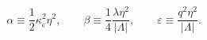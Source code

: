 \begin{equation}\label{eq:dimless2}
\alpha\equiv\frac{1}{2}\kappa_{_6}^2\eta^2,\qquad
\beta\equiv\frac{1}{4}\frac{\lambda\eta^2}{|\Lambda|},\qquad
\varepsilon\equiv\frac{q^2\eta^2}{|\Lambda|}.
\end{equation}


